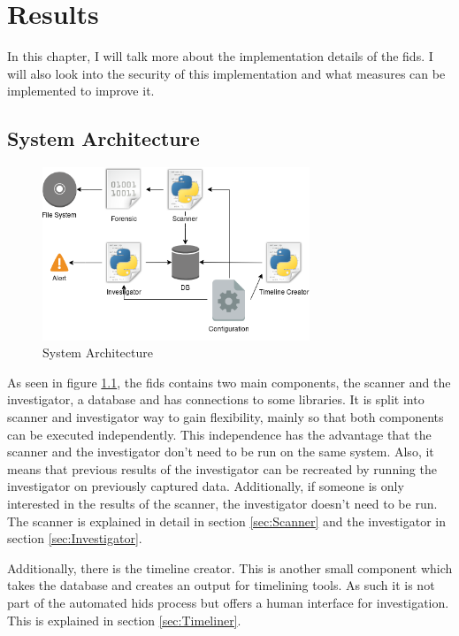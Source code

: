 
\chapter{Results}

In this chapter, I will talk more about the implementation details of the \gls{fids}. I will also look into the security of this implementation and what measures can be implemented to improve it. 

\section{System Architecture}
\label{sec:Architecture}

\begin{figure}[ht]
	\includegraphics[width=8cm]{../img/Overview_FIDS.png}
	\centering
	\caption{System Architecture}
	\label{fig:systemArchitecture}
\end{figure}

As seen in figure \ref{fig:systemArchitecture}, the \gls{fids} contains two main components, the scanner and the investigator, a database and has connections to some libraries. It is split into scanner and investigator way to gain flexibility, mainly so that both components can be executed independently. This independence has the advantage that the scanner and the investigator don't need to be run on the same system. Also, it means that previous results of the investigator can be recreated by running the investigator on previously captured data. Additionally, if someone is only interested in the results of the scanner, the investigator doesn't need to be run. The scanner is explained in detail in section \ref{sec:Scanner} and the investigator in section \ref{sec:Investigator}.

Additionally, there is the timeline creator. This is another small component which takes the database and creates an output for timelining tools. As such it is not part of the automated \gls{hids} process but offers a human interface for investigation. This is explained in section \ref{sec:Timeliner}. 

